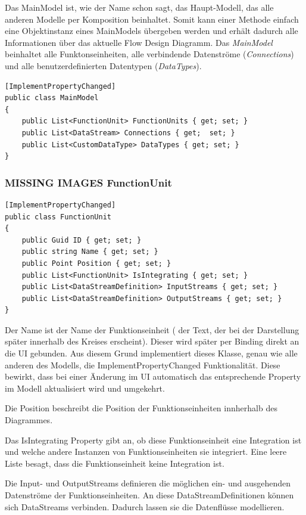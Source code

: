 Das MainModel ist, wie der Name schon sagt, das Haupt-Modell, das alle
anderen Modelle per Komposition beinhaltet. Somit kann einer Methode einfach eine Objektinstanz
eines MainModels übergeben werden und erhält dadurch alle Informationen über das aktuelle Flow Design Diagramm. 
Das \textit{MainModel} beinhaltet alle Funktonseinheiten, alle verbindende
Datenströme (\textit{Connections}) und alle benutzerdefinierten Datentypen (\textit{DataTypes}).

\begin{lstlisting}[caption=MainModel Klasse]
[ImplementPropertyChanged]
public class MainModel
{
	public List<FunctionUnit> FunctionUnits { get; set; }
	public List<DataStream> Connections { get;  set; }
	public List<CustomDataType> DataTypes { get; set; } 
}
\end{lstlisting}

\subsubsection{{\bfseries\sffamily MISSING IMAGES} FunctionUnit}


\begin{lstlisting}[caption=FunctionUnit Klasse]
[ImplementPropertyChanged]
public class FunctionUnit
{
	public Guid ID { get; set; }
	public string Name { get; set; }
	public Point Position { get; set; }
	public List<FunctionUnit> IsIntegrating { get; set; }
	public List<DataStreamDefinition> InputStreams { get; set; }
	public List<DataStreamDefinition> OutputStreams { get; set; }
}
\end{lstlisting}

Der Name ist der Name der Funktionseinheit ( der Text, der bei der
Darstellung später innerhalb des Kreises erscheint). Dieser wird später per Binding
direkt an die UI gebunden. Aus diesem Grund implementiert dieses Klasse,
genau wie alle anderen des Modells, die ImplementPropertyChanged
Funktionalität. Diese bewirkt, dass bei einer Änderung im UI automatisch das
entsprechende Property im Modell aktualisiert wird und umgekehrt.

Die Position beschreibt die Position der Funktionseinheiten innherhalb des
Diagrammes.  

Das IsIntegrating Property gibt an, ob diese Funktionseinheit eine Integration
ist und welche andere Instanzen von Funktionseinheiten sie integriert.
Eine leere Liste besagt, dass die Funktionseinheit keine Integration ist.

Die Input- und OutputStreams definieren die möglichen ein- und ausgehenden
Datenströme der Funktionseinheiten. An diese DataStreamDefinitionen können sich DataStreams
verbinden. Dadurch lassen sie die Datenflüsse modellieren.


